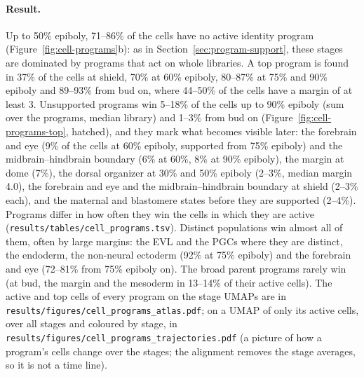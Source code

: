 \documentclass[11pt,a4paper]{article}
\begin{document}
\paragraph{Result.} Up to 50\% epiboly, 71--86\% of the cells have no active identity program (Figure~\ref{fig:cell-programs}b): as in Section~\ref{sec:program-support}, these stages are dominated by programs that act on whole libraries. A top program is found in 37\% of the cells at shield, 70\% at 60\% epiboly, 80--87\% at 75\% and 90\% epiboly and 89--93\% from bud on, where 44--50\% of the cells have a margin of at least 3. Unsupported programs win 5--18\% of the cells up to 90\% epiboly (sum over the programs, median library) and 1--3\% from bud on (Figure~\ref{fig:cell-programs-top}, hatched), and they mark what becomes visible later: the forebrain and eye (9\% of the cells at 60\% epiboly, supported from 75\% epiboly) and the midbrain--hindbrain boundary (6\% at 60\%, 8\% at 90\% epiboly), the margin at dome (7\%), the dorsal organizer at 30\% and 50\% epiboly (2--3\%, median margin 4.0), the forebrain and eye and the midbrain--hindbrain boundary at shield (2--3\% each), and the maternal and blastomere states before they are supported (2--4\%). Programs differ in how often they win the cells in which they are active (\nolinkurl{results/tables/cell_programs.tsv}). Distinct populations win almost all of them, often by large margins: the EVL and the PGCs where they are distinct, the endoderm, the non-neural ectoderm (92\% at 75\% epiboly) and the forebrain and eye (72--81\% from 75\% epiboly on). The broad parent programs rarely win (at bud, the margin and the mesoderm in 13--14\% of their active cells). The active and top cells of every program on the stage UMAPs are in \nolinkurl{results/figures/cell_programs_atlas.pdf}; on a UMAP of only its active cells, over all stages and coloured by stage, in \nolinkurl{results/figures/cell_programs_trajectories.pdf} (a picture of how a program's cells change over the stages; the alignment removes the stage averages, so it is not a time line).
\end{document}
